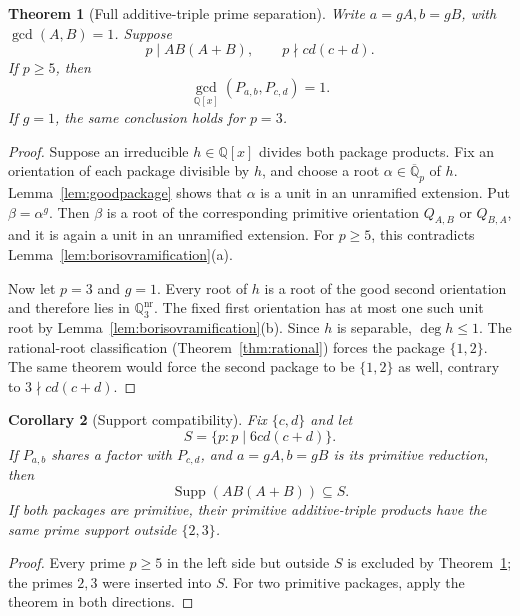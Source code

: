 \documentclass[11pt]{article}
\newtheorem{theorem}{Theorem}[section]
\newtheorem{corollary}[theorem]{Corollary}
\theoremstyle{definition}
\newcommand{\Q}{\mathbb Q}
\begin{document}
\begin{theorem}[Full additive-triple prime separation]
\label{thm:fullseparation}
Write \(a=gA,b=gB\), with \(\gcd(A,B)=1\).  Suppose
\begin{equation}
 p\mid AB(A+B),\qquad p\nmid cd(c+d).
 \tag{11.1}
\end{equation}
If \(p\geq5\), then
\begin{equation}
 \gcd_{\Q[x]}(P_{a,b},P_{c,d})=1.
 \tag{11.2}
\end{equation}
If \(g=1\), the same conclusion holds for \(p=3\).
\end{theorem}

\begin{proof}
Suppose an irreducible \(h\in\Q[x]\) divides both package products.  Fix an
orientation of each package divisible by \(h\), and choose a root
\(\alpha\in\overline{\Q}_p\) of \(h\).  Lemma~\ref{lem:goodpackage}
shows that \(\alpha\) is a unit in an unramified extension.  Put
\(\beta=\alpha^g\).  Then \(\beta\) is a root of the corresponding primitive
orientation \(Q_{A,B}\) or \(Q_{B,A}\), and it is again a unit in an
unramified extension.  For \(p\geq5\), this contradicts
Lemma~\ref{lem:borisovramification}(a).

Now let \(p=3\) and \(g=1\).  Every root of \(h\) is a root of the good
second orientation and therefore lies in \(\Q_3^{\mathrm{nr}}\).  The fixed
first orientation has at most one such unit root by
Lemma~\ref{lem:borisovramification}(b).  Since \(h\) is separable,
\(\deg h\leq1\).  The rational-root classification
(Theorem~\ref{thm:rational}) forces the package \(\{1,2\}\).  The same
theorem would force the second package to be \(\{1,2\}\) as well, contrary
to \(3\nmid cd(c+d)\).
\end{proof}

\begin{corollary}[Support compatibility]
\label{cor:supportcompatibility}
Fix \(\{c,d\}\) and let
\[
 S=\{p:p\mid6cd(c+d)\}.
\]
If \(P_{a,b}\) shares a factor with \(P_{c,d}\), and
\(a=gA,b=gB\) is its primitive reduction, then
\begin{equation}
 \operatorname{Supp}(AB(A+B))\subseteq S.
 \tag{11.3}
\end{equation}
If both packages are primitive, their primitive additive-triple products have
the same prime support outside \(\{2,3\}\).
\end{corollary}

\begin{proof}
Every prime \(p\geq5\) in the left side but outside \(S\) is excluded by
Theorem~\ref{thm:fullseparation}; the primes \(2,3\) were inserted into
\(S\).  For two primitive packages, apply the theorem in both directions.
\end{proof}
\end{document}
